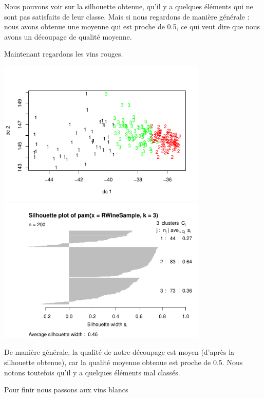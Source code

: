 \documentclass[
]{article}
\begin{document}
Nous pouvons voir sur la silhouette obtenue, qu'il y a quelques éléments qui
ne sont pas satisfaits de leur classe. Mais si nous regardons de manière
générale : nous avons obtenue une moyenne qui est proche de 0.5, ce qui
veut dire que nous avons un découpage de qualité moyenne.

Maintenant regardons les vins rouges.
\begin{center}
	\includegraphics[width=10cm]{repport_files/figure-latex/unnamed-chunk-13-1.pdf}
	\includegraphics[width=10cm]{repport_files/figure-latex/unnamed-chunk-13-2.pdf} 
\end{center}

De manière générale, la qualité de notre découpage est moyen (d'après la
silhouette obtenue), car la qualité moyenne obtenue est proche de 0.5.
Nous notons toutefois qu'il y a quelques éléments mal classés.

Pour finir nous passons aux vins blancs
\end{document}
